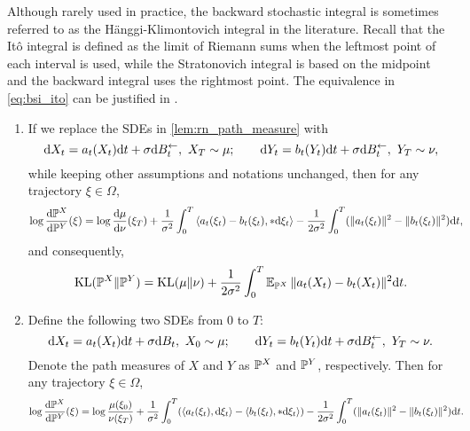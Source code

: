 \begin{remark}
    Although rarely used in practice, the backward stochastic integral is sometimes referred to as the H\"anggi-Klimontovich integral in the literature. Recall that the It\^o integral is defined as the limit of Riemann sums when the leftmost point of each interval is used, while the Stratonovich integral is based on the midpoint and the backward integral uses the rightmost point. The equivalence in \cref{eq:bsi_ito} can be justified in \citet[Chap. 3.3]{karatzas1991brownian}. 
\end{remark}

\begin{lemma}
\begin{enumerate}[wide=0pt,itemsep=0pt, topsep=0pt,parsep=0pt,partopsep=0pt]
    \item If we replace the SDEs in \cref{lem:rn_path_measure} with
    $$\d X_t =a_t(X_t)\d t+\sigma\d\Bl_t,~X_T\sim\mu;\qquad\d Y_t =b_t(Y_t)\d t+\sigma\d\Bl_t,~Y_T\sim\nu,$$
    while keeping other assumptions and notations unchanged, then for any trajectory $\xi\in\Omega$, 
    \begin{align*}
        \log\de{\P^X}{\P^Y}(\xi) & =\log\de{\mu}{\nu}(\xi_T)+\frac{1}{\sigma^2}\int_0^T\inn{a_t(\xi_t)-b_t(\xi_t),*\d\xi_t}-\frac{1}{2\sigma^2}\int_0^T(\|a_t(\xi_t)\|^2-\|b_t(\xi_t)\|^2)\d t,
    \end{align*}
    and consequently, 
    $$\kl(\P^X\|\P^Y)=\kl(\mu\|\nu)+\frac{1}{2\sigma^2}\int_0^T\E_{\P^X}\|a_t(X_t)-b_t(X_t)\|^2\d t.$$

    \item Define the following two SDEs from $0$ to $T$:
    $$\d X_t =a_t(X_t)\d t+\sigma\d B_t,~X_0\sim\mu;\qquad\d Y_t =b_t(Y_t)\d t+\sigma\d\Bl_t,~Y_T\sim\nu.$$
    Denote the path measures of $X$ and $Y$ as $\P^X$ and $\P^Y$, respectively. Then for any trajectory $\xi\in\Omega$,
    \begin{align*}
        \log\de{\P^X}{\P^Y}(\xi) & =\log\frac{\mu(\xi_0)}{\nu(\xi_T)}+\frac{1}{\sigma^2}\int_0^T(\inn{a_t(\xi_t),\d\xi_t}-\inn{b_t(\xi_t),*\d\xi_t})-\frac{1}{2\sigma^2}\int_0^T(\|a_t(\xi_t)\|^2-\|b_t(\xi_t)\|^2)\d t.
    \end{align*}
\end{enumerate}
\label{lem:rn_path_measure_contd}
\end{lemma}

